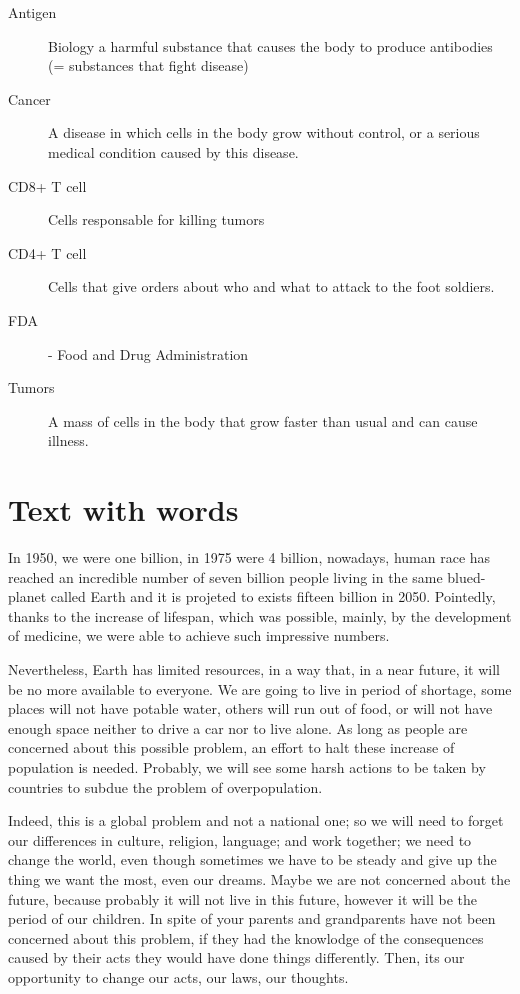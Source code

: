 \documentclass[a4paper,12pt]{article}
\begin{document}
\begin{description}
\item[Antigen] Biology a harmful substance that causes the body to produce antibodies (= substances that fight disease)
\item[Cancer] A disease in which cells in the body grow without control, or a serious medical condition caused by this disease.
\item[CD8+ T cell] Cells responsable for killing tumors
\item[CD4+ T cell] Cells that give orders about who and what to  attack to the
  foot soldiers.
\item[FDA] - Food and Drug Administration
\item[Tumors] A mass  of cells in the  body that grow faster than  usual and can
  cause illness.
\end{description}


%
%
\newpage


\section{Text with words}

In 1950, we were one billion, in 1975 were 4 billion, nowadays, human race has reached an incredible number of seven billion people
living  in the  same blued-planet  called Earth  and it  is projeted  to exists fifteen
billion in 2050.  {\color{red}Pointedly}, thanks to the increase
of  {\color{red}lifespan}, which was possible, mainly, by the development of medicine, we were
able to achieve such impressive numbers.

Nevertheless, Earth has  limited resources, in a way that, in  a near future, it
will  be no  more available  to everyone.  We  are going  to live  in period  of
shortage, some places will not have potable water, others will run out of food,
or will not have enough space neither to  drive a car nor to live alone. As long
as   people  are   concerned  about   this  possible   problem,  an   effort  to
{\color{red}halt} these increase of population  is needed. Probably, we will see
some {\color{red}harsh} actions to be taken by countries to {\color{red}subdue} the problem of overpopulation.

 Indeed, this is  a global problem and not a national  one; so we will
need to forget our differences in culture, religion, language; and work
together; we need to change the world, even though sometimes we have to be steady and give up the thing we
want the  most, even our  dreams. Maybe we  are not concerned about  the future,
because probably it will not live in  this future, however it will be the period
of our children. In spite of your parents and grandparents have not been concerned
about this  problem, if  they had  the knowlodge of  the consequences  caused by
their acts they would have done things differently. Then, its our opportunity to
change our acts, our laws, our thoughts.
\end{document}
